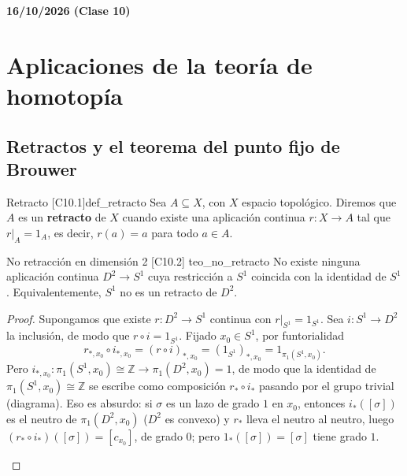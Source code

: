 \textbf{16/10/2026 (Clase 10)}
\section{Aplicaciones de la teoría de homotopía}

\subsection{Retractos y el teorema del punto fijo de Brouwer}

\begin{definicion}{Retracto [C10.1]}{def_retracto}
Sea $A \subseteq X$, con $X$ espacio topológico. Diremos que $A$ es un \textbf{retracto} de $X$ cuando existe una aplicación continua $r \colon X \to A$ tal que $r|_A = 1_A$, es decir, $r(a) = a$ para todo $a \in A$.
\end{definicion}

\begin{teorema}{No retracción en dimensión 2 [C10.2] \marcaT}{teo_no_retracto}
No existe ninguna aplicación continua $D^2 \to S^1$ cuya restricción a $S^1$ coincida con la identidad de $S^1$. Equivalentemente, $S^1$ no es un retracto de $D^2$.
\end{teorema}

\begin{proof}
Supongamos que existe $r \colon D^2 \to S^1$ continua con $r|_{S^1} = 1_{S^1}$. Sea $i \colon S^1 \to D^2$ la inclusión, de modo que $r \circ i = 1_{S^1}$. Fijado $x_0 \in S^1$, por funtorialidad
\[ r_{*,x_0} \circ i_{*,x_0} = (r \circ i)_{*,x_0} = (1_{S^1})_{*,x_0} = 1_{\pi_1(S^1,x_0)}. \]
Pero $i_{*,x_0} \colon \pi_1(S^1,x_0) \cong \mathbb{Z} \to \pi_1(D^2,x_0) = 1$, de modo que la identidad de $\pi_1(S^1,x_0) \cong \mathbb{Z}$ se escribe como composición $r_* \circ i_*$ pasando por el grupo trivial (diagrama). Eso es absurdo: si $\sigma$ es un lazo de grado $1$ en $x_0$, entonces $i_*([\sigma])$ es el neutro de $\pi_1(D^2,x_0)$ ($D^2$ es convexo) y $r_*$ lleva el neutro al neutro, luego $(r_* \circ i_*)([\sigma]) = [c_{x_0}]$, de grado $0$; pero $1_*([\sigma]) = [\sigma]$ tiene grado $1$.
\begin{center}
\end{center}
\end{proof}

